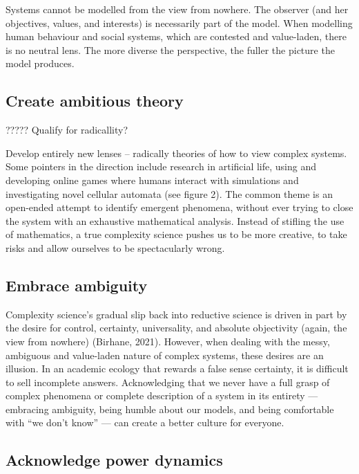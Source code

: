 Systems cannot be modelled from the view from nowhere. The observer (and her objectives, values, and interests) is necessarily part of the model. When modelling human behaviour and social systems, which are contested and value-laden, there is no neutral lens. The more diverse the perspective, the fuller the picture the model produces.   


\subsection{Create ambitious theory}

????? Qualify for radicallity?

Develop entirely new lenses – radically theories of how to view complex systems. Some pointers in the direction include research in artificial life, using and developing online games where humans interact with simulations and investigating novel cellular automata (see figure 2). The common theme is an open-ended attempt to identify emergent phenomena, without ever trying to close the system with an exhaustive mathematical analysis. Instead of stifling the use of mathematics, a true complexity science pushes us to be more creative, to take risks and allow ourselves to be spectacularly wrong.  


\subsection{Embrace ambiguity}

Complexity science’s gradual slip back into reductive science is driven in part by the desire for control, certainty, universality, and absolute objectivity (again, the view from nowhere) (Birhane, 2021). However, when dealing with the messy, ambiguous and value-laden nature of complex systems, these desires are an illusion. In an academic ecology that rewards a false sense certainty, it is difficult to sell incomplete answers. Acknowledging that we never have a full grasp of complex phenomena or complete description of a system in its entirety — embracing ambiguity, being humble about our models, and being comfortable with “we don’t know” — can create a better culture for everyone.  



\subsection{Acknowledge power dynamics}

